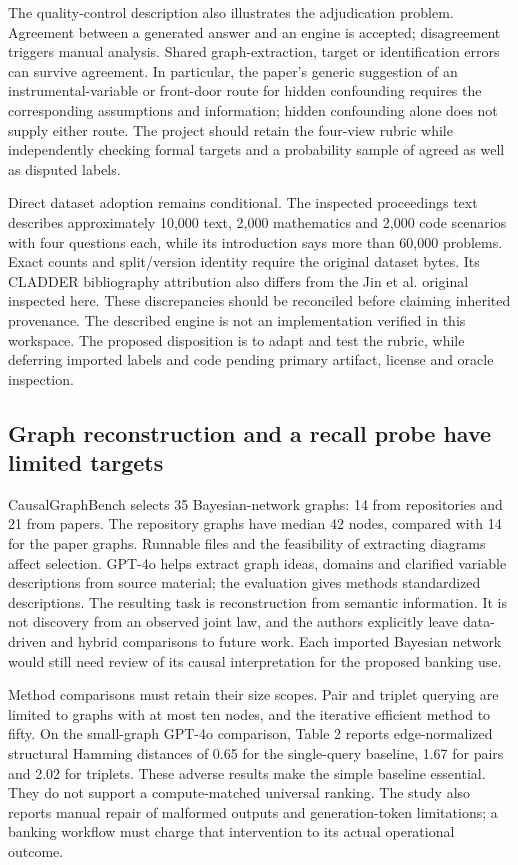 The quality-control description also illustrates the adjudication problem.
Agreement between a generated answer and an engine is accepted; disagreement
triggers manual analysis. Shared graph-extraction, target or identification
errors can survive agreement. In particular, the paper's generic suggestion
of an instrumental-variable or front-door route for hidden confounding
requires the corresponding assumptions and information; hidden confounding
alone does not supply either route. The project should retain the four-view
rubric while independently checking formal targets and a probability sample
of agreed as well as disputed labels.

Direct dataset adoption remains conditional. The inspected proceedings text
describes approximately 10,000 text, 2,000 mathematics and 2,000 code scenarios
with four questions each, while its introduction says more than 60,000
problems. Exact counts and split/version identity require the original
dataset bytes. Its CLADDER bibliography attribution also differs from the
Jin et al. original inspected here. These discrepancies should be reconciled
before claiming inherited provenance. The described engine is not an
implementation verified in this workspace. The proposed disposition is to
adapt and test the rubric, while deferring imported labels and code pending
primary artifact, license and oracle inspection.
\citep{exec14_l7_causalbench}

\subsection{Graph reconstruction and a recall probe have limited targets}

CausalGraphBench selects 35 Bayesian-network graphs: 14 from repositories
and 21 from papers. The repository graphs have median 42 nodes, compared
with 14 for the paper graphs. Runnable files and the feasibility of extracting
diagrams affect selection. GPT-4o helps extract graph ideas, domains and
clarified variable descriptions from source material; the evaluation gives
methods standardized descriptions. The resulting task is reconstruction
from semantic information. It is not discovery from an observed joint law,
and the authors explicitly leave data-driven and hybrid comparisons to
future work. Each imported Bayesian network would still need review of
its causal interpretation for the proposed banking use.
\citep{exec14_l7_causalgraphbench}

Method comparisons must retain their size scopes. Pair and triplet querying
are limited to graphs with at most ten nodes, and the iterative efficient
method to fifty. On the small-graph GPT-4o comparison, Table 2 reports
edge-normalized structural Hamming distances of 0.65 for the single-query
baseline, 1.67 for pairs and 2.02 for triplets. These adverse results make
the simple baseline essential. They do not support a compute-matched
universal ranking. The study also reports manual repair of malformed
outputs and generation-token limitations; a banking workflow must charge
that intervention to its actual operational outcome.

